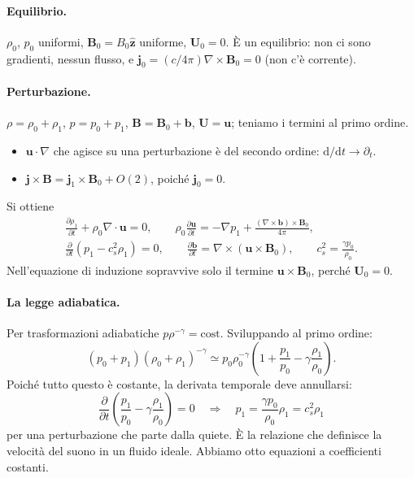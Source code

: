 \paragraph{Equilibrio.} $\rho_0$, $p_0$ uniformi, $\mathbf{B}_0=B_0\hat{\mathbf{z}}$ uniforme, $\mathbf{U}_0=0$. È un equilibrio: non ci sono gradienti, nessun flusso, e $\mathbf{j}_0=(c/4\pi)\nabla\times\mathbf{B}_0=0$ (non c'è corrente).

\paragraph{Perturbazione.} $\rho=\rho_0+\rho_1$, $p=p_0+p_1$, $\mathbf{B}=\mathbf{B}_0+\mathbf{b}$, $\mathbf{U}=\mathbf{u}$; teniamo i termini al primo ordine.
\begin{itemize}
\item $\mathbf{u}\cdot\nabla$ che agisce su una perturbazione è del secondo ordine: $\mathrm{d}/\mathrm{d}t\to\partial_t$.
\item $\mathbf{j}\times\mathbf{B}=\mathbf{j}_1\times\mathbf{B}_0+O(2)$, poiché $\mathbf{j}_0=0$.
\end{itemize}
Si ottiene
\begin{gather}
\frac{\partial\rho_1}{\partial t}+\rho_0\nabla\cdot\mathbf{u}=0,\qquad
\rho_0\frac{\partial\mathbf{u}}{\partial t}=-\nabla p_1+\frac{(\nabla\times\mathbf{b})\times\mathbf{B}_0}{4\pi},\\
\frac{\partial}{\partial t}\left(p_1-c_s^2\rho_1\right)=0,\qquad
\frac{\partial\mathbf{b}}{\partial t}=\nabla\times(\mathbf{u}\times\mathbf{B}_0),\qquad c_s^2=\frac{\gamma p_0}{\rho_0}.
\end{gather}
Nell'equazione di induzione sopravvive solo il termine $\mathbf{u}\times\mathbf{B}_0$, perché $\mathbf{U}_0=0$.

\paragraph{La legge adiabatica.} Per trasformazioni adiabatiche $p\rho^{-\gamma}=\text{cost}$. Sviluppando al primo ordine:
\begin{equation}
(p_0+p_1)(\rho_0+\rho_1)^{-\gamma}\simeq p_0\rho_0^{-\gamma}\left(1+\frac{p_1}{p_0}-\gamma\frac{\rho_1}{\rho_0}\right).
\end{equation}
Poiché tutto questo è costante, la derivata temporale deve annullarsi:
\begin{equation}
\frac{\partial}{\partial t}\left(\frac{p_1}{p_0}-\gamma\frac{\rho_1}{\rho_0}\right)=0
\quad\Longrightarrow\quad p_1=\frac{\gamma p_0}{\rho_0}\rho_1=c_s^2\rho_1
\end{equation}
per una perturbazione che parte dalla quiete. È la relazione che definisce la velocità del suono in un fluido ideale. Abbiamo otto equazioni a coefficienti costanti.

